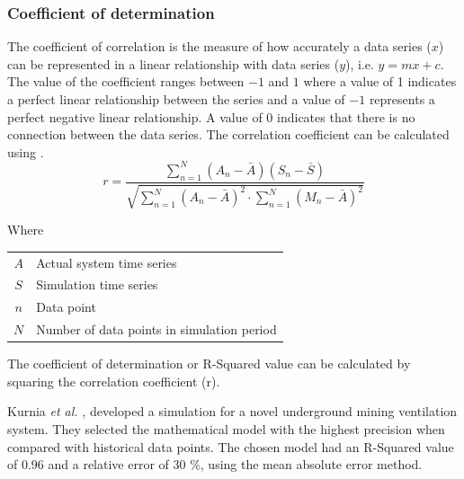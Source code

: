  		\subsubsection{Coefficient of determination}
 		The coefficient of correlation is the measure of how accurately a data series ($ x $) can be represented in a linear relationship with data series ($ y $), i.e. $ y = mx+c$. The value of the coefficient ranges between $ -1 $ and $ 1 $ where a value of 1 indicates a perfect linear relationship between the series and a value of $ -1 $ represents a perfect negative linear relationship. A value of 0 indicates that there is no connection between the data series. The correlation coefficient can be calculated using  \cite{sarin2010comparing}.
 		\begin{equation}
 		\label{eq: Correlation coefficient}
 		r = \dfrac{\sum_{n=1}^{N}(A_n - \bar{A})(S_n - \bar{S})}{\sqrt{\sum_{n=1}^{N}(A_n - \bar{A})^2 \cdot \sum_{n=1}^{N}(M_n - \bar{A})^2}}
 		\end{equation}
 		\par
 		Where \par
 		\begin{table}[!htbp]
 			\centering
 			\begin{tabular}{cl}
 				$A$ & Actual system time series \\
 				$S$ & Simulation time series \\
 				$n$ & Data point \\
 				$N$ & Number of data points in simulation period \\
 			\end{tabular} 
 		\end{table}	
 		The coefficient of determination or R-Squared value can be calculated by squaring the correlation coefficient (r). 
 		\par 
 			Kurnia \textit{et al.} \cite{kurnia2014simulation}, \cite{kurnia2014dust} developed a simulation for a novel underground mining ventilation system. They selected the mathematical model with the highest precision when compared with historical data points. The chosen model had an R-Squared value of 0.96 and a relative error of 30 \%, using the mean absolute error method. 
 			
